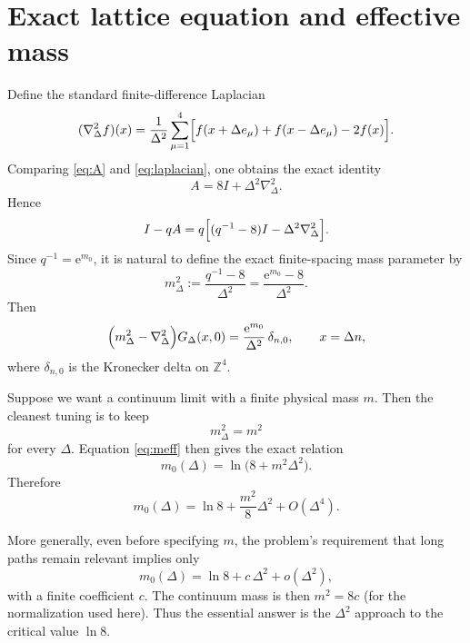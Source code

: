 \documentclass[11pt]{article}
\newcommand{\Z}{\mathbb Z}
\newcommand{\e}{\mathrm e}
\begin{document}
	\section{Exact lattice equation and effective mass}
	Define the standard finite-difference Laplacian
	\begin{equation}
		\label{eq:laplacian}
		(\nabla_\Delta^2f)(x)
		=\frac1{\Delta^2}\sum_{\mu=1}^4
		\Bigl[f(x+\Delta e_\mu)+f(x-\Delta e_\mu)-2f(x)\Bigr].
	\end{equation}
	Comparing \eqref{eq:A} and \eqref{eq:laplacian}, one obtains the exact identity
	\begin{equation}
		\label{eq:A-lap}
		A=8I+\Delta^2\nabla_\Delta^2.
	\end{equation}
	Hence
	\[
	I-qA
	=q\Bigl[(q^{-1}-8)I-\Delta^2\nabla_\Delta^2\Bigr].
	\]
	Since $q^{-1}=\e^{m_0}$, it is natural to define the exact finite-spacing mass parameter by
	\begin{equation}
		\label{eq:meff}
		m_\Delta^2:=\frac{q^{-1}-8}{\Delta^2}
		=\frac{\e^{m_0}-8}{\Delta^2}.
	\end{equation}
	Then
	\begin{equation}
		\label{eq:lattice-green-equation}
		\Bigl(m_\Delta^2-\nabla_\Delta^2\Bigr)G_\Delta(x,0)
		=\frac{\e^{m_0}}{\Delta^2}\,\delta_{n,0},
		\qquad x=\Delta n,
	\end{equation}
	where $\delta_{n,0}$ is the Kronecker delta on $\Z^4$.
	
	Suppose we want a continuum limit with a finite physical mass $m$. Then the cleanest tuning is to keep
	\[
	m_\Delta^2=m^2
	\]
	for every $\Delta$. Equation \eqref{eq:meff} then gives the exact relation
	\begin{equation}
		\label{eq:exact-tuning}
		\boxed{
			m_0(\Delta)=\ln\!\bigl(8+m^2\Delta^2\bigr).}
	\end{equation}
	Therefore
	\begin{equation}
		\label{eq:tuning}
		\boxed{
			m_0(\Delta)=\ln8+\frac{m^2}{8}\Delta^2+O(\Delta^4).}
	\end{equation}
	
	More generally, even before specifying $m$, the problem's requirement that long paths remain relevant implies only
	\begin{equation}
		\label{eq:general-tuning}
		\boxed{
			m_0(\Delta)=\ln8+c\,\Delta^2+o(\Delta^2),}
	\end{equation}
	with a finite coefficient $c$. The continuum mass is then $m^2=8c$ (for the normalization used here). Thus the essential answer is the $\Delta^2$ approach to the critical value $\ln8$.
	
\end{document}
